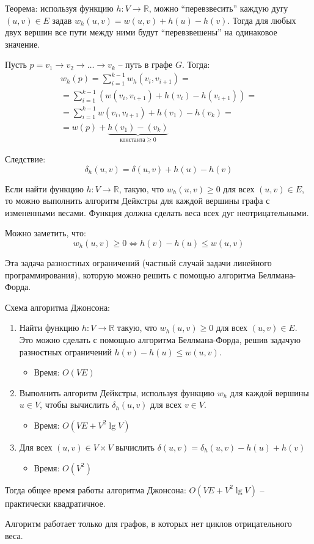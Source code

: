 \documentclass[11pt]{article}
\begin{document}
Теорема: используя функцию $h: V \rightarrow \mathbb{R}$, можно ``перевзвесить'' каждую дугу $(u, v) \in E$ задав $w_h(u, v) = w(u, v) + h(u) - h(v)$. Тогда для любых двух вершин все пути между ними будут ``перевзвешены'' на одинаковое значение.

Пусть $p = v_1 \rightarrow v_2 \rightarrow \ldots \rightarrow v_k$ -- путь в графе $G$. Тогда:
\begin{align*}
  w_h(p) = \sum_{i=1}^{k-1} w_h(v_i, v_{i+1}) = \\
  = \sum_{i=1}^{k-1} (w(v_i, v_{i+1}) + h(v_i) - h(v_{i+1})) = \\
  = \sum_{i=1}^{k-1} w(v_i, v_{i+1}) + h(v_1) - h(v_k) = \\
  = w(p) + \underbrace{h(v_1) - (v_k)}_{\text{константа} \geqslant 0}
\end{align*}

Следствие:
\begin{equation*}
  \delta_h(u, v) = \delta(u, v) + h(u) - h(v)
\end{equation*}

Если найти функцию $h: V \rightarrow \mathbb{R}$, такую, что $w_h(u, v) \geqslant 0$ для всех $(u, v) \in E$, то можно выполнить алгоритм Дейкстры для каждой вершины графа с измененными весами. Функция должна сделать веса всех дуг неотрицательными.

Можно заметить, что:
\begin{equation*}
  w_h(u, v) \geqslant 0 \iff h(v) - h(u) \leqslant w(u, v)
\end{equation*}

Эта задача разностных ограничений (частный случай задачи линейного программирования), которую можно решить с помощью алгоритма Беллмана-Форда.

Схема алгоритма Джонсона:
\begin{enumerate}
\item Найти функцию $h: V \rightarrow \mathbb{R}$ такую, что $w_h(u, v) \geqslant 0$ для всех $(u, v) \in E$. Это можно сделать с помощью алгоритма Беллмана-Форда, решив задачую разностных ограничений $h(v) - h(u) \leqslant w(u, v)$.
  \begin{itemize}
  \item Время: $O(V E)$
  \end{itemize}
\item Выполнить алгоритм Дейкстры, используя функцию $w_h$ для каждой вершины $u \in V$, чтобы вычислить $\delta_h(u, v)$ для всех $v \in V$.
  \begin{itemize}
  \item Время: $O(V E + V^2 \lg V)$
  \end{itemize}
\item Для всех $(u, v) \in V \times V$ вычислить $\delta(u, v) = \delta_h(u, v) - h(u) + h(v)$
  \begin{itemize}
  \item Время: $O(V^2)$
  \end{itemize}
\end{enumerate}

Тогда общее время работы алгоритма Джонсона: $O(V E + V^2 \lg V)$ -- практически квадратичное.

Алгоритм работает только для графов, в которых нет циклов отрицательного веса.
\end{document}
